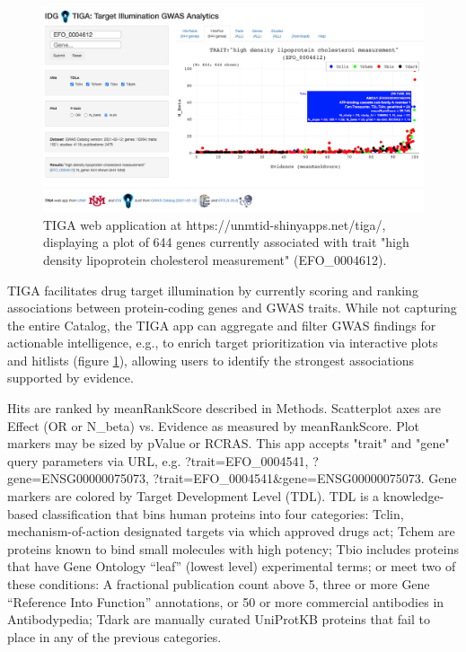 \begin{figure}
	\includegraphics[width=\textwidth]{figures/tiga/FIG03_TIGA_EFO_0004612_plot.png}
	\caption{TIGA web application at https://unmtid-shinyapps.net/tiga/, displaying a plot of 644 genes currently associated with trait "high density lipoprotein cholesterol measurement" (EFO\_0004612).}
	\label{fig:TIGA_app}
\end{figure}

TIGA facilitates drug target illumination by currently scoring and ranking associations between protein-coding genes and GWAS traits. While not capturing the entire Catalog, the TIGA app can aggregate and filter GWAS findings for actionable intelligence, e.g., to enrich target prioritization via interactive plots and hitlists (figure \ref{fig:TIGA_app}), allowing users to identify the strongest associations supported by evidence.

Hits are ranked by meanRankScore described in Methods. Scatterplot axes are Effect (OR or N\_beta) vs. Evidence as measured by meanRankScore. Plot markers may be sized by pValue or RCRAS. This app accepts "trait" and "gene" query parameters via URL, e.g. ?trait=EFO\_0004541, ?gene=ENSG00000075073, ?trait=EFO\_0004541\&gene=ENSG00000075073.  Gene markers are colored by Target Development Level (TDL)\cite{Oprea2018-cp}. TDL is a knowledge-based classification that bins human proteins into four categories: Tclin, mechanism-of-action designated targets via which approved drugs act\cite{Santos2017-sd,Ursu2019-hx,Avram2020-ff}; Tchem are proteins known to bind small molecules with high potency; Tbio includes proteins that have Gene Ontology\cite{Ashburner2000-aw} “leaf” (lowest level) experimental terms; or meet two of these conditions:  A fractional publication count\cite{Pafilis2013-ml} above 5, three or more Gene “Reference Into Function” annotations\cite{Mitchell2003-ty}, or 50 or more commercial antibodies in Antibodypedia\cite{Bjorling2008-ia}; Tdark are manually curated UniProtKB proteins that fail to place in any of the previous categories.


